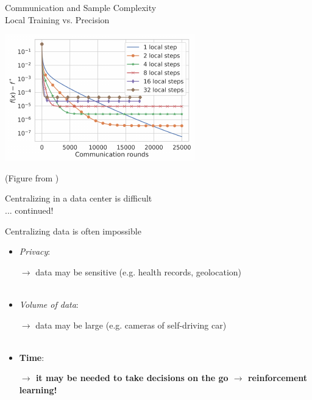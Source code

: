 \documentclass[aspectratio=169,12pt]{beamer}
\begin{document}

\begin{frame}{Communication and Sample Complexity\\[-0.5em]
    \large Local Training vs. Precision}
  
  \vspace{-1em}
  
  \begin{center}
    \includegraphics[width=0.6\linewidth]{images/comm-vs-local.pdf}
  \end{center}

  \vspace{-1em}

  \footnotesize
  (Figure from )
\end{frame}


\begin{frame}{Centralizing in a data center is difficult\\[-0.5em]
  \normalsize ... continued!}

  Centralizing data is often impossible
  \begin{itemize}
  \item \emph{Privacy}:

    {\small
    $\rightarrow$ data may be sensitive (e.g. health records, geolocation)
    }
    \\
    ~

  \item \emph{Volume of data}:

    {\small
      $\rightarrow$ data may be large (e.g. cameras of self-driving car)
    }
    \\
    ~

    \pause
    
  \item \color{red} \textbf{Time}: 

    \color{red}
    
    \textbf{\small
        $\rightarrow$ it may be needed to take decisions on the go $\rightarrow$ reinforcement learning!
      }

    
  \end{itemize}

\end{frame}
\end{document}
